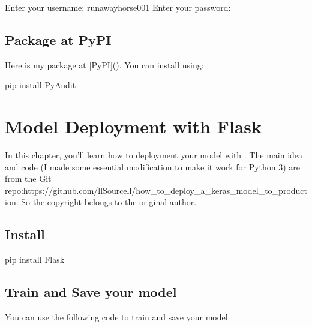 \documentclass[letterpaper,12pt,english]{sphinxmanual}
\begin{document}
\begin{sphinxVerbatim}[commandchars=\\\{\}]
Enter your username: runawayhorse001
Enter your password:
\end{sphinxVerbatim}


\section{Package at PyPI}
\label{\detokenize{pypi:package-at-pypi}}
\sphinxAtStartPar
Here is my  package at {[}PyPI{]}(). You can install  using:

\begin{sphinxVerbatim}[commandchars=\\\{\}]
pip install PyAudit
\end{sphinxVerbatim}


\chapter{Model Deployment with Flask}
\label{\detokenize{deploy:model-deployment-with-flask}}\label{\detokenize{deploy:deploy}}\label{\detokenize{deploy::doc}}
\sphinxAtStartPar
In this chapter, you’ll learn how to deployment your model with . The main idea and code (I made some essential modification to make it work for Python 3) are from the Git repo:https://github.com/llSourcell/how\_to\_deploy\_a\_keras\_model\_to\_production. So the copyright belongs to the original author.


\section{Install }
\label{\detokenize{deploy:install-flask}}
\begin{sphinxVerbatim}[commandchars=\\\{\}]
pip install Flask
\end{sphinxVerbatim}


\section{Train and Save your model}
\label{\detokenize{deploy:train-and-save-your-model}}
\sphinxAtStartPar
You can use the following code to train and save your  model:
\end{document}
